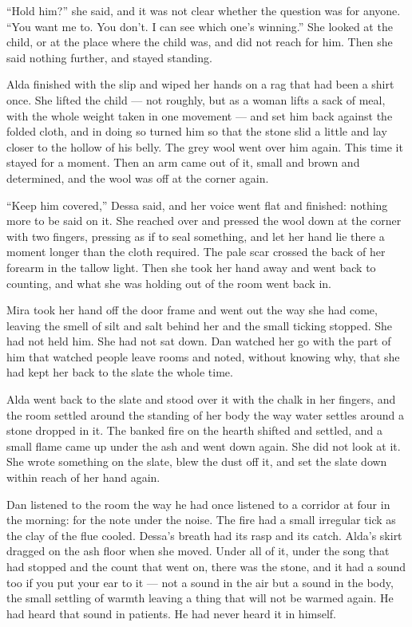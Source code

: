 “Hold him?” she said, and it was not clear whether the question was for anyone. “You want me to. You don't. I can see which one's winning.” She looked at the child, or at the place where the child was, and did not reach for him. Then she said nothing further, and stayed standing.

Alda finished with the slip and wiped her hands on a rag that had been a shirt once. She lifted the child --- not roughly, but as a woman lifts a sack of meal, with the whole weight taken in one movement --- and set him back against the folded cloth, and in doing so turned him so that the stone slid a little and lay closer to the hollow of his belly. The grey wool went over him again. This time it stayed for a moment. Then an arm came out of it, small and brown and determined, and the wool was off at the corner again.

“Keep him covered,” Dessa said, and her voice went flat and finished: nothing more to be said on it. She reached over and pressed the wool down at the corner with two fingers, pressing as if to seal something, and let her hand lie there a moment longer than the cloth required. The pale scar crossed the back of her forearm in the tallow light. Then she took her hand away and went back to counting, and what she was holding out of the room went back in.

Mira took her hand off the door frame and went out the way she had come, leaving the smell of silt and salt behind her and the small ticking stopped. She had not held him. She had not sat down. Dan watched her go with the part of him that watched people leave rooms and noted, without knowing why, that she had kept her back to the slate the whole time.

Alda went back to the slate and stood over it with the chalk in her fingers, and the room settled around the standing of her body the way water settles around a stone dropped in it. The banked fire on the hearth shifted and settled, and a small flame came up under the ash and went down again. She did not look at it. She wrote something on the slate, blew the dust off it, and set the slate down within reach of her hand again.

Dan listened to the room the way he had once listened to a corridor at four in the morning: for the note under the noise. The fire had a small irregular tick as the clay of the flue cooled. Dessa's breath had its rasp and its catch. Alda's skirt dragged on the ash floor when she moved. Under all of it, under the song that had stopped and the count that went on, there was the stone, and it had a sound too if you put your ear to it --- not a sound in the air but a sound in the body, the small settling of warmth leaving a thing that will not be warmed again. He had heard that sound in patients. He had never heard it in himself.

